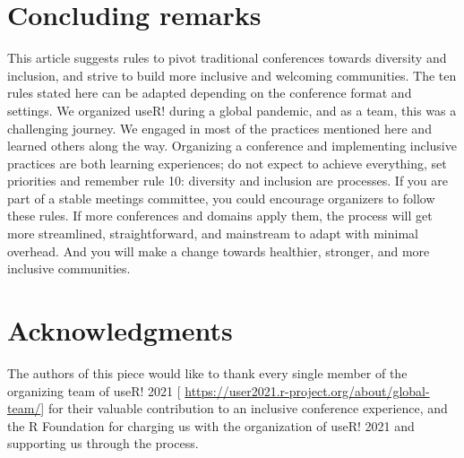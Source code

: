 \documentclass[10pt,letterpaper]{article}
\begin{document}

\section*{Concluding remarks}

This article suggests rules to pivot traditional conferences towards diversity and inclusion, and strive to build more inclusive and welcoming communities. 
The ten rules stated here can be adapted depending on the conference format and settings.
We organized useR! during a global pandemic, and as a team, this was a challenging journey. 
We engaged in most of the practices mentioned here and learned others along the way. 
Organizing a conference and implementing inclusive practices are both learning experiences;
do not expect to achieve everything, set priorities and remember rule 10: diversity and inclusion are processes. 
If you are part of a stable meetings committee, you could encourage organizers to follow these rules. 
If more conferences and domains apply them, the process will get more streamlined, straightforward, and mainstream to adapt with minimal overhead.
And you will make a change towards healthier, stronger, and more inclusive communities.


\section*{Acknowledgments}
The authors of this piece would like to thank every single member of the organizing team of useR! 2021 [ \url{https://user2021.r-project.org/about/global-team/}] for their valuable contribution to an inclusive conference experience, and the R Foundation for charging us with the organization of useR! 2021 and supporting us through the process. 
\end{document}
